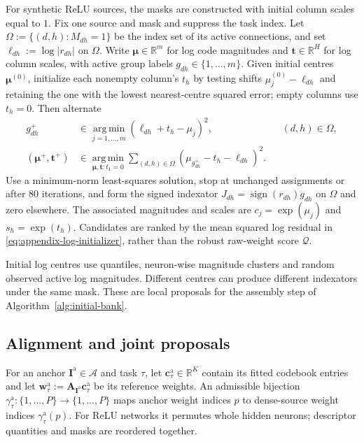 For synthetic ReLU sources, the masks are constructed with initial
column scales equal to $1$. Fix one source and mask and suppress the
task index. Let $\Omega:=\{(d,h):M_{dh}=1\}$ be the index set of
its active connections, and set $\ell_{dh}:=\log|r_{dh}|$ on $\Omega$.
Write $\boldsymbol\mu\in\mathbb R^m$ for log code magnitudes and
$\mathbf t\in\mathbb R^H$ for log column scales, with active group
labels $g_{dh}\in\{1,\ldots,m\}$.
Given initial centres $\boldsymbol\mu^{(0)}$, initialize each
nonempty column's $t_h$ by testing shifts
$\mu_j^{(0)}-\ell_{dh}$ and retaining the one with the lowest
nearest-centre squared error; empty columns use $t_h=0$.
Then alternate
\begin{equation}
    \begin{aligned}
        g_{dh}^{+}
            &\in\operatorname*{arg\,min}_{j=1,\ldots,m}
                (\ell_{dh}+t_h-\mu_j)^2,
                &&(d,h)\in\Omega,\\
        (\boldsymbol\mu^{+},\mathbf t^{+})
            &\in\operatorname*{arg\,min}_{\boldsymbol\mu,\mathbf t:
                t_1=0}
                \sum_{(d,h)\in\Omega}
                    (\mu_{g_{dh}^{+}}-t_h-\ell_{dh})^2.
    \end{aligned}
    \label{eq:appendix-log-initializer}
\end{equation}
Use a minimum-norm least-squares solution, stop at unchanged
assignments or after 80 iterations, and form the signed indexator
$J_{dh}=\operatorname{sign}(r_{dh})g_{dh}$ on $\Omega$ and zero
elsewhere. The associated magnitudes and scales are
$c_j=\exp(\mu_j)$ and $s_h=\exp(t_h)$.
Candidates are ranked by the mean squared log residual in
\eqref{eq:appendix-log-initializer}, rather than the robust raw-weight
score $\mathcal Q$.

Initial log centres use quantiles, neuron-wise magnitude clusters
and random observed active log magnitudes. Different centres can
produce different indexators under the same mask. These are local
proposals for the assembly step of Algorithm~\ref{alg:initial-bank}.

\subsection{Alignment and joint proposals}
\label{app:source-alignment}

For an anchor $\mathbf I^{\mathrm a}\in\mathcal A$ and task $\tau$,
let $\mathbf c_\tau^{\mathrm a}\in\mathbb R^K$ contain its fitted
codebook entries and let $\mathbf w_\tau^{\mathrm a}:=
\mathbf A_{\mathbf I^{\mathrm a}}\mathbf c_\tau^{\mathrm a}$ be its
reference weights. An admissible bijection
$\gamma_\tau^{\mathrm a}:\{1,\ldots,P\}\to\{1,\ldots,P\}$ maps
anchor weight indices $p$ to dense-source weight indices
$\gamma_\tau^{\mathrm a}(p)$. For ReLU networks it permutes whole
hidden neurons; descriptor quantities and masks are reordered together.


